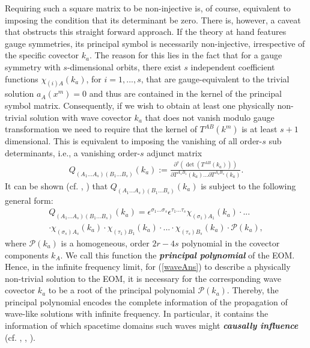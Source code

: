\documentclass[%
preprint,
nofootinbib,
amsmath,amssymb,
aps,
prd,
floatfix,
]{revtex4-2}
\begin{document}
Requiring such a square matrix to be non-injective is, of course, equivalent to imposing the condition that its determinant be zero. There is, however, a caveat that obstructs this straight forward approach. If the theory at hand features gauge symmetries, its principal symbol is necessarily non-injective, irrespective of the specific covector $k_a$. 
The reason for this lies in the fact that for a gauge symmetry with $s$-dimensional orbits, there exist $s$ independent coefficient functions $\chi_{(i)A}(k_a)$, for $i = 1,...,s$, that are gauge-equivalent to the trivial solution $a_A(x^m)=0$ and thus are contained in the kernel of the principal symbol matrix. 
Consequently, if we wish to obtain at least one physically non-trivial solution with wave covector $k_a$ that does not vanish modulo gauge transformation we need to require that the kernel of $T^{AB}(k^m)$ is at least $s+1$ dimensional. This is equivalent to imposing the vanishing of all order-$s$ sub determinants, i.e., a vanishing order-$s$ adjunct matrix
\begin{align}
    Q_{(A_1...A_s) (B_1...B_s)}(k_a) := \frac{\partial^s (\operatorname{det}(T^{AB}(k_a)))}{\partial T^{A_1 B_1}(k_a) ... \partial T^{A_s B_s}(k_a)}.
\end{align}  
It can be shown (cf. \cite{2018PhRvD..97h4036D}, \cite{2009JPhA...42U5402I}) that $Q_{(A_1...A_s) (B_1...B_s)}(k_a)$ is subject to the following general form:
\begin{multline}
    Q_{(A_1...A_s) (B_1...B_s)}(k_a) = \epsilon^{\sigma_1...\sigma_s} \epsilon^{\tau_1...\tau_s} \chi_{(\sigma_1)A_1}(k_a) \cdot ... \\
    \cdot \chi_{(\sigma_s)A_s}(k_a) \cdot \chi_{(\tau_1)B_1}(k_a) \cdot ... \cdot \chi_{(\tau_s)B_s}(k_a) \cdot \mathcal{P}(k_a),
\end{multline}
where $\mathcal{P}(k_a)$ is a homogeneous, order $2r-4s$ polynomial in the covector components $k_A$. We call this function the \textit{\textbf{principal polynomial}} of the EOM.
Hence, in the infinite frequency limit, for (\ref{waveAns}) to describe a physically non-trivial solution to the EOM, it is necessary for the corresponding wave covector $k_a$ to be a root of the principal polynomial $\mathcal{P}(k_a)$. 
Thereby, the principal polynomial encodes the complete information of the propagation of wave-like solutions with infinite frequency. In particular, it contains the information of which spacetime domains such waves might \textit{\textbf{causally influence}} (cf. \cite{2012arXiv1211.1914K}, \cite{seiler2009involution}, \cite{2011PhRvD..83d4047R}).
\end{document}
